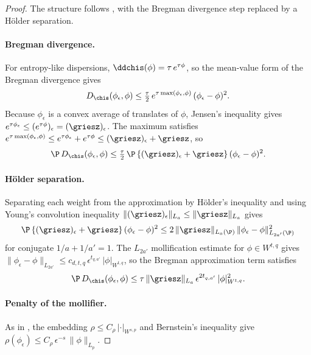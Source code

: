 \documentclass{article}
\begin{document}
\begin{proof}
The structure follows
,
with the Bregman divergence step
replaced by a H\"older separation.

\paragraph{Bregman divergence.}
For entropy-like dispersions,
$\ddchis(\phi) = \tau\, e^{\tau\phi}$,
so the mean-value form
of the Bregman divergence gives
\[
D_{\chis}(\phi_\epsilon, \phi)
  \le \tfrac{\tau}{2}\,
  e^{\tau\max(\phi_\epsilon, \phi)}\,
  (\phi_\epsilon - \phi)^2.
\]
Because $\phi_\epsilon$ is a convex average
of translates of $\phi$,
Jensen's inequality gives
$e^{\tau\phi_\epsilon} \le (e^{\tau\phi})_\epsilon
  = (\griesz)_\epsilon$.
The maximum satisfies
$e^{\tau\max(\phi_\epsilon,\phi)}
  \le e^{\tau\phi_\epsilon} + e^{\tau\phi}
  \le (\griesz)_\epsilon + \griesz$,
so
\begin{equation}
\label{eq:bregman-mollification-E}
\P\,D_{\chis}(\phi_\epsilon, \phi)
  \le \tfrac{\tau}{2}\,
  \P\,\{(\griesz)_\epsilon + \griesz\}\,
    (\phi_\epsilon - \phi)^2.
\end{equation}

\paragraph{H\"older separation.}
Separating each weight from the approximation
by H\"older's inequality
and using Young's convolution inequality
$\|(\griesz)_\epsilon\|_{L_a} \le \|\griesz\|_{L_a}$
gives
\[
\P\,\{(\griesz)_\epsilon + \griesz\}\,
  (\phi_\epsilon - \phi)^2
  \le 2\,\|\griesz\|_{L_a(\P)}\,
  \|\phi_\epsilon - \phi\|_{L_{2a'}(\P)}^2
\]
for conjugate $1/a + 1/a' = 1$.
The $L_{2a'}$ mollification estimate
for $\phi \in W^{t,q}$ gives
$\|\phi_\epsilon - \phi\|_{L_{2a'}}
  \le c_{d,t,q}\,\epsilon^{t_{q,a'}}\,|\phi|_{W^{t,q}}$,
so the Bregman approximation term satisfies
\begin{equation}
\label{eq:bregman-approx-E}
\P\,D_{\chis}(\phi_\epsilon, \phi)
  \le \tau\,\|\griesz\|_{L_a}\,
  \epsilon^{2t_{q,a'}}\,|\phi|_{W^{t,q}}^2.
\end{equation}

\paragraph{Penalty of the mollifier.}
As in ,
the embedding $\rho \le C_\rho\,|\cdot|_{W^{s,p}}$
and Bernstein's inequality give
$\rho(\phi_\epsilon)
  \le C_\rho\,\epsilon^{-s}\,\|\phi\|_{L_p}$.


\end{proof}
\end{document}

